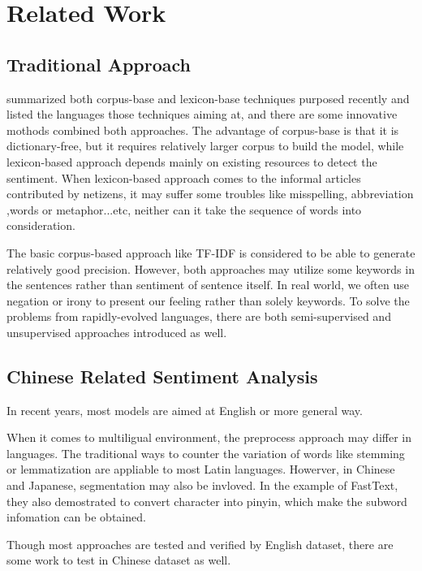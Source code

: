 \chapter{Related Work}


\section{Traditional Approach}

\cite{Dashtipour2016} summarized both corpus-base and lexicon-base techniques purposed recently and listed the languages those techniques aiming at, and there are some innovative mothods combined both approaches. 
The advantage of corpus-base is that it is dictionary-free, but it requires relatively larger corpus to build the model, while lexicon-based approach depends mainly on existing resources to detect the sentiment.
When lexicon-based approach comes to the informal articles contributed by netizens, it may suffer some troubles like misspelling, abbreviation ,words or metaphor...etc, neither can it take the sequence of words into consideration.   

The basic corpus-based approach like TF-IDF is considered to be able to generate relatively good precision.
However, both approaches may utilize some keywords in the sentences rather than sentiment of sentence itself. In real world, we often use negation or irony to present our feeling rather than solely keywords. 
To solve the problems from rapidly-evolved languages, there are both semi-supervised and unsupervised approaches introduced as well. 

\section{Chinese Related Sentiment Analysis}

In recent years, most models are aimed at English or more general way. 

When it comes to multiligual environment, the preprocess approach may differ in languages. The traditional ways to counter the variation of words like stemming or lemmatization are appliable to most Latin languages.
Howerver, in Chinese and Japanese, segmentation may also be invloved. In the example of FastText\cite{joulin2016fasttext}, they also demostrated to convert character into pinyin, which make the subword infomation can be obtained. 

Though most approaches are tested and verified by English dataset, there are some work to test in Chinese dataset as well.

